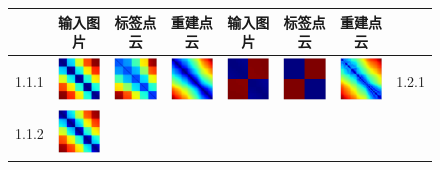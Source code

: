 \documentclass[bachelor, nocolorlinks, printoneside]{seuthesis} %
\begin{document}
\begin{Main}
\begin{figure}[ht!]
    \begin{centering}
        \begin{tabular}{cccc|cccc}
        \toprule
         &输入图片 & 标签点云 & 重建点云 & 输入图片 & 标签点云 & 重建点云& \\
        \toprule
        1.1.1 &\includegraphics[width=0.12\columnwidth,keepaspectratio]{figs/toyset_matrices/cluster_5by20_1_1.png} &
        \includegraphics[width=0.12\columnwidth,keepaspectratio]{figs/toyset_matrices/cluster_5by20_1_2.png} &
        \includegraphics[width=0.12\columnwidth,keepaspectratio]{figs/toyset_matrices/cluster_5by20_1_3.png} &  
        \includegraphics[width=0.12\columnwidth,keepaspectratio]{figs/toyset_matrices/cluster_2by10_1_1.png} &
        \includegraphics[width=0.12\columnwidth,keepaspectratio]{figs/toyset_matrices/cluster_2by10_1_2.png} &
        \includegraphics[width=0.12\columnwidth,keepaspectratio]{figs/toyset_matrices/cluster_2by10_1_3.png}& 1.2.1\\
        1.1.2 &\includegraphics[width=0.12\columnwidth,keepaspectratio]{figs/toyset_matrices/cluster_5by20_2_1.png} &

\end{tabular}
\end{centering}
\end{figure}
\end{Main}
\end{document}
